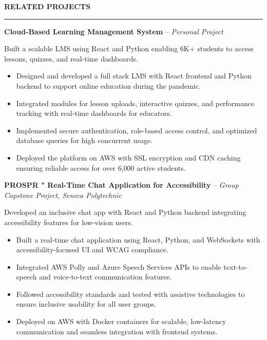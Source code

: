 \documentclass[10pt,letterpaper]{article}
\begin{document}
\vspace{6pt}

\textbf{RELATED PROJECTS}\\[-8pt]
\noindent\rule{\textwidth}{1pt}

\vspace{-2pt}

\textbf{Cloud-Based Learning Management System} -- \emph{Personal Project}

\vspace{-1pt}

Built a scalable LMS using React and Python enabling 6K+ students to access lessons, quizzes, and real-time dashboards.
\vspace{-1pt}
\begin{itemize}
\item Designed and developed a full stack LMS with React frontend and Python backend to support online education during the pandemic.
\item Integrated modules for lesson uploads, interactive quizzes, and performance tracking with real-time dashboards for educators.
\item Implemented secure authentication, role-based access control, and optimized database queries for high concurrent usage.
\item Deployed the platform on AWS with SSL encryption and CDN caching ensuring reliable access for over 6,000 active students.
\end{itemize}

\textbf{PROSPR " Real-Time Chat Application for Accessibility} -- \emph{Group Capstone Project, Seneca Polytechnic}

\vspace{-1pt}

Developed an inclusive chat app with React and Python backend integrating accessibility features for low-vision users.
\vspace{-1pt}
\begin{itemize}
\item Built a real-time chat application using React, Python, and WebSockets with accessibility-focused UI and WCAG compliance.
\item Integrated AWS Polly and Azure Speech Services APIs to enable text-to-speech and voice-to-text communication features.
\item Followed accessibility standards and tested with assistive technologies to ensure inclusive usability for all user groups.
\item Deployed on AWS with Docker containers for scalable, low-latency communication and seamless integration with frontend systems.
\end{itemize}
\end{document}

